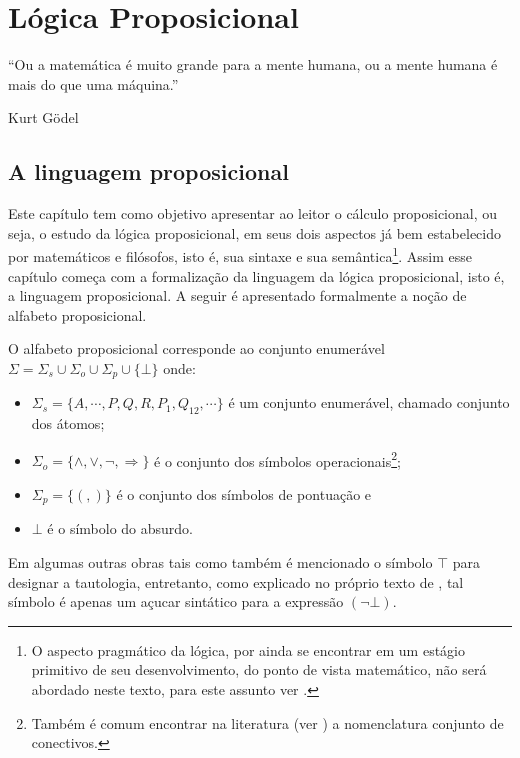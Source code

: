 \chapter{Lógica Proposicional}\label{cap:LogicsPropositional}

\epigraph{``Ou a matemática é muito grande para a mente humana, ou a mente humana é mais do que uma máquina.''}{Kurt Gödel}

\section{A linguagem proposicional}\label{A Linguagem proposicional}

Este capítulo tem como objetivo apresentar ao leitor o cálculo proposicional, ou seja, o estudo da lógica proposicional, em seus dois aspectos já bem estabelecido por matemáticos e filósofos, isto é,  sua sintaxe e sua semântica\footnote{O aspecto pragmático da lógica, por ainda se encontrar em um estágio primitivo de seu desenvolvimento, do ponto de vista matemático, não será abordado neste texto, para este assunto ver \cite{rodrigues2021, silva2018}.}. Assim esse capítulo começa com a formalização da linguagem da lógica proposicional, isto é, a linguagem proposicional. A seguir é apresentado formalmente a noção de alfabeto proposicional.

\begin{definicao}\label{def:AlfabetoProposicional}
  O alfabeto proposicional corresponde ao conjunto enumerável $\Sigma = \Sigma_s \cup \Sigma_o \cup \Sigma_p \cup \{\bot\}$ onde:
  \begin{itemize}
      \item $\Sigma_s = \{A, \cdots, P, Q, R, P_1, Q_{12}, \cdots\}$ é um conjunto enumerável, chamado conjunto dos átomos;
      \item $\Sigma_o = \{\land, \lor, \neg, \Rightarrow\}$ é o conjunto dos símbolos operacionais\footnote{Também é comum encontrar na literatura (ver \cite{joaoPavao2014}) a nomenclatura conjunto de conectivos.};
      \item $\Sigma_p = \{(, )\}$ é o conjunto dos símbolos de pontuação e
      \item $\bot$ é o símbolo do absurdo.
  \end{itemize}
\end{definicao}

Em algumas outras obras tais como \cite{carmo2013} também é mencionado o símbolo $\top$ para designar a tautologia, entretanto, como explicado no próprio texto de \cite{carmo2013}, tal símbolo é apenas um açucar sintático para a expressão $(\neg \bot)$.

